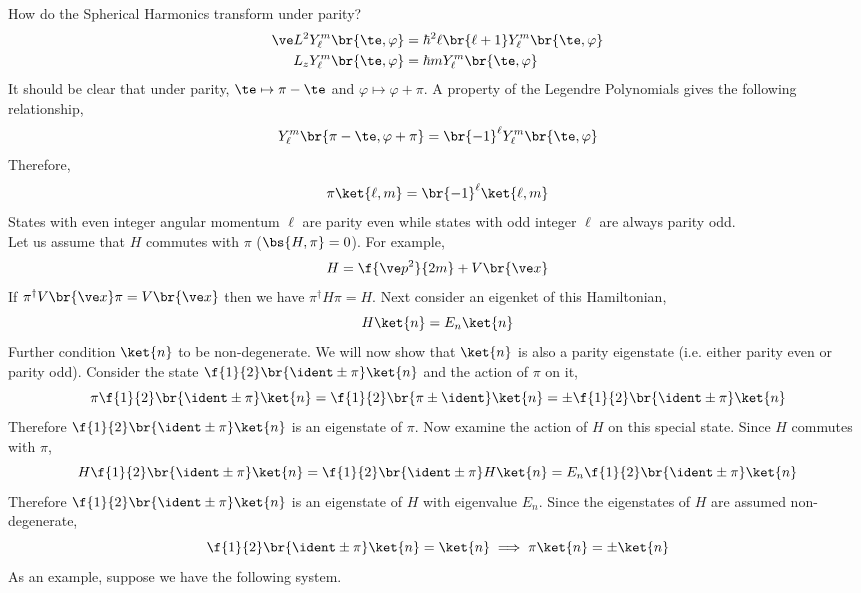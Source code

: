 \documentclass{article}
\begin{document}
How do the Spherical Harmonics transform under parity?
\begin{align*}
    \ve L^2 Y_{\ell}^m \br{\te, \varphi} &= \hbar^2 \ell \br{\ell + 1}Y_{\ell}^m \br{\te, \varphi} \\
    L_z Y_{\ell}^m \br{\te, \varphi} &= \hbar m Y_{\ell}^m \br{\te, \varphi}
\end{align*}
It should be clear that under parity, $\te \mapsto \pi - \te$ and $\varphi \mapsto \varphi + \pi$. A property of the Legendre Polynomials gives the following relationship,
\[ Y_{\ell}^m \br{\pi - \te, \varphi + \pi} = \br{-1}^{\ell} Y_{\ell}^m \br{\te, \varphi} \]
Therefore,
\[ \pi\ket{\ell, m} = \br{-1}^{\ell} \ket{\ell, m} \]
States with even integer angular momentum $\ell$ are parity even while states with odd integer $\ell$ are always parity odd. \\

Let us assume that $H$ commutes with $\pi$ ($\bs{H, \pi} = 0$). For example,
\[ H = \f{\ve p^2}{2m} + V\br{\ve x} \]
If $\pi^\dagger V\br{\ve x} \pi = V\br{\ve x}$ then we have $\pi^\dagger H \pi = H$. Next consider an eigenket of this Hamiltonian,
\[ H \ket{n} = E_n \ket{n} \]
Further condition $\ket{n}$ to be non-degenerate. We will now show that $\ket{n}$ is also a parity eigenstate (i.e. either parity even or parity odd). Consider the state $\f{1}{2}\br{\ident \pm \pi} \ket{n}$ and the action of $\pi$ on it,
\[ \pi \f{1}{2}\br{\ident \pm \pi} \ket{n} = \f{1}{2}\br{\pi \pm \ident} \ket{n} = \pm\f{1}{2}\br{\ident \pm \pi} \ket{n} \]
Therefore $\f{1}{2}\br{\ident \pm \pi} \ket{n}$ is an eigenstate of $\pi$. Now examine the action of $H$ on this special state. Since $H$ commutes with $\pi$,
\[ H\f{1}{2}\br{\ident \pm \pi} \ket{n} = \f{1}{2}\br{\ident \pm \pi} H\ket{n} = E_n\f{1}{2}\br{\ident \pm \pi} \ket{n} \]
Therefore $\f{1}{2}\br{\ident \pm \pi} \ket{n}$ is an eigenstate of $H$ with eigenvalue $E_n$. Since the eigenstates of $H$ are assumed non-degenerate,
\[ \f{1}{2}\br{\ident \pm \pi} \ket{n} = \ket{n} \implies \pi \ket{n} = \pm \ket{n} \]
As an example, suppose we have the following system.
\end{document}
